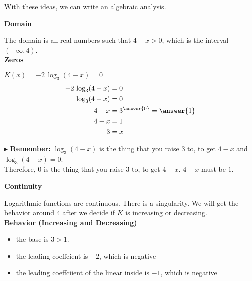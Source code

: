 \documentclass{ximera}
\begin{document}
\begin{example}
\begin{idea}
\begin{image}
\end{image}




With these ideas, we can write an algebraic analysis. \\

\end{idea}







\textbf{Domain}

The domain is all real numbers such that $4 - x > 0$, which is the interval $(-\infty, 4)$.\\



\textbf{Zeros}


$K(x) = -2 \, \log_3(4-x) = 0$ \\


\begin{align*}
-2 \, \log_3(4-x) & = 0 \\
\log_3(4-x) & = 0 \\
4 - x & = 3^{\answer{0}} = \answer{1} \\
4 - x & = 1 \\
3 & = x
\end{align*}


$\blacktriangleright$ \textbf{Remember:} $\log_3(4 - x)$ is the thing that you raise $3$ to, to get $4 - x$ and $\log_3(4 - x) = 0$.  \\

Therefore, $0$ is the thing that you raise $3$ to, to get $4 - x$. $4 - x$ must be $1$.




\textbf{Continuity}

Logarithmic functions are continuous. There is a singularity.  We will get the behavior around $4$ after we decide if $K$ is increasing or decreasing.\\





\textbf{Behavior (Increasing and Decreasing)}


\begin{itemize}
  \item the base is $3 > 1$.
  \item the leading coeffcient is $-2$, which is negative
  \item the leading coeffciient of the linear inside is $-1$, which is negative
\end{itemize}



\end{example}
\end{document}
